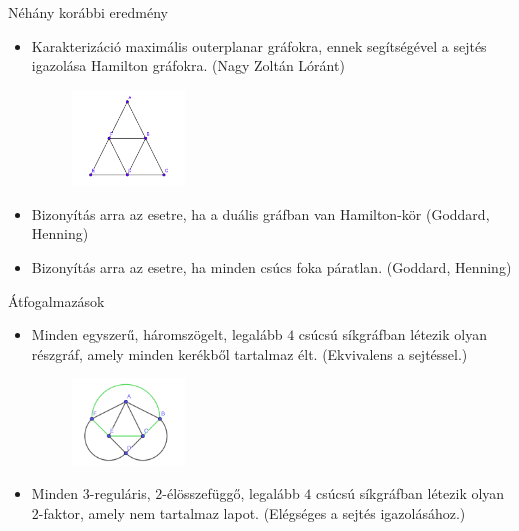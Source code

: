 \documentclass{beamer}
\begin{document}
\begin{frame}{Néhány korábbi eredmény}
		\begin{itemize}
			\item Karakterizáció maximális outerplanar gráfokra, ennek segítségével
			a sejtés igazolása Hamilton gráfokra. (Nagy Zoltán Lóránt)
			\begin{figure}[h]
				\centering
				\includegraphics[width=30mm]{sungraph}
			\end{figure}
			\item Bizonyítás arra az esetre, ha a duális gráfban van Hamilton-kör (Goddard, Henning)
			\item Bizonyítás arra az esetre, ha minden csúcs foka páratlan. (Goddard, Henning)
		\end{itemize}
\end{frame}

\begin{frame}{Átfogalmazások}
	\begin{itemize}
		\item Minden egyszerű, háromszögelt, legalább $4$ csúcsú síkgráfban létezik
			olyan részgráf, amely minden kerékből tartalmaz élt. (Ekvivalens a sejtéssel.)
			\begin{figure}[h]
				\centering
				\includegraphics[width=30mm]{wheel}
			\end{figure}
		\item Minden $3$-reguláris, $2$-élösszefüggő, legalább $4$ csúcsú síkgráfban létezik
			olyan $2$-faktor, amely nem tartalmaz lapot. (Elégséges a sejtés igazolásához.)
	\end{itemize}
\end{frame}
\end{document}
